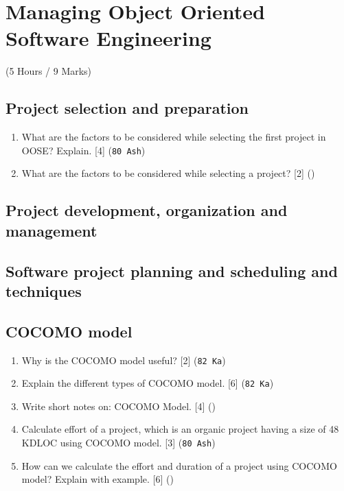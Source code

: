 \documentclass[12pt]{article}
\begin{document}
\pagebreak

\section{Managing Object Oriented Software Engineering}
  \begin{center} (5 Hours / 9 Marks) \end{center}
  
  \subsection{Project selection and preparation}
    \begin{enumerate}
      \item What are the factors to be considered while selecting the first project in OOSE? Explain. \hfill [4] (\texttt{80 Ash})
      \item What are the factors to be considered while selecting a project? \hfill [2] ()
    \end{enumerate}

  \subsection{Project development, organization and management}
  \subsection{Software project planning and scheduling and techniques}
  \subsection{COCOMO model}
    \begin{enumerate}
      \item Why is the COCOMO model useful? \hfill [2] (\texttt{82 Ka})
      
      \item Explain the different types of COCOMO model. \hfill [6] (\texttt{82 Ka})

      \item Write short notes on: COCOMO Model. \hfill [4] ()

      \item Calculate effort of a project, which is an organic project having a size of 48 KDLOC using COCOMO model. \hfill [3] (\texttt{80 Ash})

      \item How can we calculate the effort and duration of a project using COCOMO model? Explain with example. \hfill [6] ()
    \end{enumerate}
\end{document}
